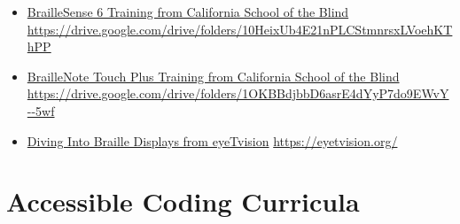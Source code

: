 {{\begin{itemize}[leftmargin=*]
\item \href{https://drive.google.com/drive/folders/10HeixUb4E21nPLCStmnrsxLVoehKThPP}{BrailleSense 6 Training from California School of the Blind} \break\url{https://drive.google.com/drive/folders/10HeixUb4E21nPLCStmnrsxLVoehKThPP}
\item \href{https://drive.google.com/drive/folders/1OKBBdjbbD6asrE4dYyP7do9EWvY--5wf}{BrailleNote Touch Plus Training from California School of the Blind} \break\url{https://drive.google.com/drive/folders/1OKBBdjbbD6asrE4dYyP7do9EWvY--5wf}
\item \href{https://eyetvision.org/}{Diving Into Braille Displays from eyeTvision} \break\url{https://eyetvision.org/}
\end{itemize}

\pagebreak\hypertarget{appx8}{}\section[Accessible Coding Curricula]{Accessible Coding Curricula}\label{appx8}
}}
